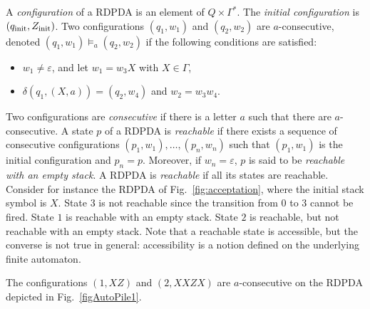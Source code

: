 A {\it configuration} of a {RDPDA} is an element of $Q\times\Gamma^*$. The
{\it initial configuration} is $(q_{\rm init},Z_{\rm init})$. Two
configurations $(q_1,w_1)$ and $(q_2,w_2)$ are $a$-consecutive, denoted
$(q_1,w_1)\models_a(q_2,w_2)$ if the following conditions are satisfied:
\begin{itemize}
\item $w_1\neq \varepsilon$, and let $w_1=w_3X$ with $X\in \Gamma$,
\item  $\delta(q_1,(X,a))=(q_2,w_4)$ and $w_2=w_3w_4$.
\end{itemize}
Two configurations are {\it consecutive} if there is a letter $a$ such that there
are $a$-consecutive. A state $p$ of a RDPDA is {\it reachable} if there
exists a sequence of consecutive configurations $(p_1,w_1),\ldots,(p_n,w_n)$
such that $(p_1,w_1)$ is the initial configuration and $p_n=p$. Moreover, if
$w_n=\varepsilon$, $p$ is said to be {\it reachable with an empty stack}. A
RDPDA is {\it reachable} if all its states are reachable. Consider for
instance the RDPDA of Fig.~\ref{fig:acceptation}, where the initial stack
symbol is $X$. State $3$ is not reachable since the transition from $0$ to
$3$ cannot be fired. State $1$ is reachable with an empty stack. State $2$ is
reachable, but not reachable with an empty stack. Note that a reachable
state is accessible, but the converse is not true in general: accessibility
is a notion defined on the underlying finite automaton. 

 The configurations $(1,XZ)$ and $(2,XXZX)$ are $a$-consecutive on the RDPDA
depicted in Fig.~\ref{figAutoPile1}. 

